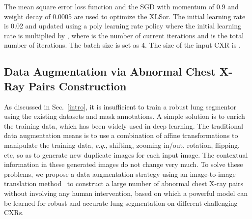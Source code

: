\documentclass{midl} \usepackage{multirow}
\newcommand{\eg}{\textit{e}.\textit{g}., }
\begin{document}
The mean square error loss function and the SGD with momentum of 0.9 and weight decay of 0.0005 are used to optimize the XLSor. The initial learning rate is 0.02 and updated using a poly learning rate policy where the initial learning rate is multiplied by , where  is the number of current iterations and  is the total number of iterations. The batch size is set as 4. The size of the input CXR is .



\subsection{Data Augmentation via Abnormal Chest X-Ray Pairs Construction}
\label{munit}
As discussed in Sec.~\ref{intro}, it is insufficient to train a robust lung segmentor using the existing datasets and mask annotations.  A simple solution is to enrich the training data, which has been widely used in deep learning. The traditional data augmentation means is to use a combination of affine transformations to manipulate the training data, \eg shifting, zooming in/out, rotation, flipping, etc, so as to generate new duplicate images for each input image. The contextual information in these generated images do not change very much. To solve these problems, we propose a data augmentation strategy using an image-to-image translation method~\cite{munit} to construct a large number of abnormal chest X-ray pairs without involving any human intervention, based on which a powerful model can be learned for robust and accurate lung segmentation on different challenging CXRs.
\end{document}

